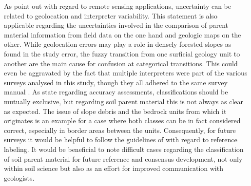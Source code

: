 \documentclass[preprint,12pt,authoryear]{elsarticle}
\begin{document}
As \cite{Olofsson2013} point out with regard to remote sensing applications, uncertainty can be related to geolocation and interpreter  variability. This statement is also applicable regarding the uncertainties involved in the comparison of parent material information from field data on the one hand and geologic maps on the other. While geolocation errors may play a role in densely forested slopes as found in the study error, the fuzzy transition from one surficial geology unit to another are the main cause for confusion at categorical transitions. This could even be aggravated by the fact that multiple interpreters were part of the various surveys analysed in this study, though they all adhered to the same survey manual \cite{Englisch1998}. As \cite{Congalton1991} state regarding accuracy assessments, classifications should be mutually exclusive, but regarding soil parent material  this is not always as clear as expected. The issue of slope debris and the bedrock units from which it originates is an example for a case where both classes can be in fact considered correct, especially in border areas between the units. Consequently, for future surveys it would be helpful to follow the guidelines of \cite{Olofsson2013}  with regard to reference labeling. It would be beneficial  to note difficult cases regarding the classification of soil parent material  for future reference and consensus development, not only within soil science but also as an effort for improved communication with geologists. 
\end{document}
